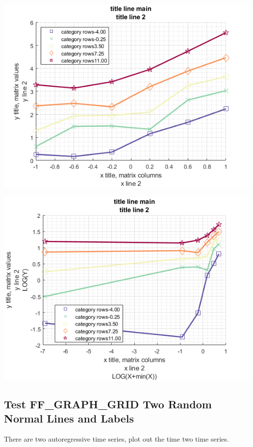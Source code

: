 \documentclass[
]{book}
\begin{document}
\includegraphics[width=5.20833in,height=\textheight]{img/fx_graph_grid_images/figure_0.png}

\includegraphics[width=5.20833in,height=\textheight]{img/fx_graph_grid_images/figure_1.png}

\hypertarget{test-ff_graph_grid-two-random-normal-lines-and-labels}{%
\subsection{Test FF\_GRAPH\_GRID Two Random Normal Lines and Labels}\label{test-ff_graph_grid-two-random-normal-lines-and-labels}}

There are two autoregressive time series, plot out the time two time
series.
\end{document}
